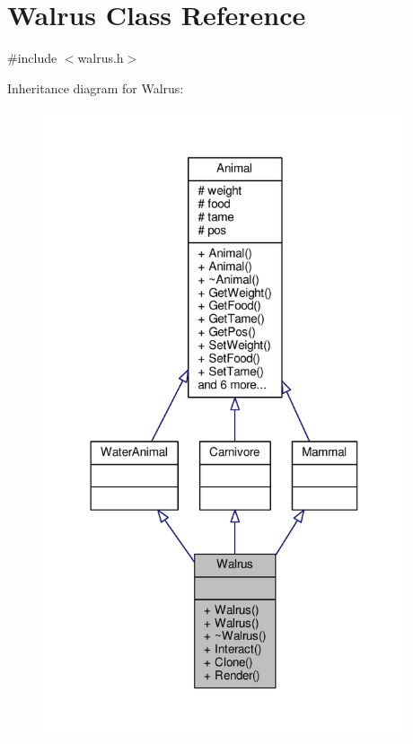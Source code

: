 \hypertarget{classWalrus}{}\section{Walrus Class Reference}
\label{classWalrus}


{\ttfamily \#include $<$walrus.\+h$>$}



Inheritance diagram for Walrus\+:
\nopagebreak
\begin{figure}[H]
\begin{center}
\leavevmode
\includegraphics[width=303pt]{classWalrus__inherit__graph}
\end{center}
\end{figure}


